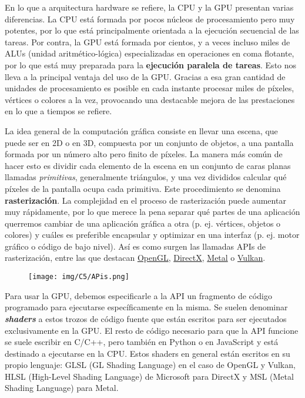 En lo que a arquitectura hardware se refiere, la CPU y la GPU presentan varias diferencias. La CPU está formada por pocos núcleos de procesamiento pero muy potentes, por lo que está principalmente orientada a la ejecución secuencial de las tareas. Por contra, la GPU está formada por cientos, y a veces incluso miles de ALUs (unidad aritmético-lógica) especializadas en operaciones en coma flotante, por lo que está muy preparada para la \textbf{ejecución paralela de tareas}. Esto nos lleva a la principal ventaja del uso de la GPU. Gracias a esa gran cantidad de unidades de procesamiento es posible en cada instante procesar miles de píxeles, vértices o colores a la vez, provocando una destacable mejora de las prestaciones en lo que a tiempos se refiere.

La idea general de la computación gráfica consiste en llevar una escena, que puede ser en 2D o en 3D, compuesta por un conjunto de objetos, a una pantalla formada por un número alto pero finito de píxeles. La manera más común de hacer esto es dividir cada elemento de la escena en un conjunto de caras planas llamadas \textit{primitivas}, generalmente triángulos, y una vez divididos calcular qué píxeles de la pantalla ocupa cada primitiva. Este procedimiento se denomina \textbf{rasterización}. La complejidad en el proceso de rasterización puede aumentar muy rápidamente, por lo que merece la pena separar qué partes de una aplicación querremos cambiar de una aplicación gráfica a otra (p. ej. vértices, objetos o colores) y cuáles es preferible encapsular y optimizar en una interfaz (p. ej. motor gráfico o código de bajo nivel). Así es como surgen las llamadas APIs de rasterización, entre las que destacan \textcolor{blue}{\href{https://www.opengl.org/}{OpenGL}}, \textcolor{blue}{\href{https://www.microsoft.com/es-es/download/details.aspx?id=35}{DirectX}}, \textcolor{blue}{\href{https://developer.apple.com/metal/}{Metal}} o \textcolor{blue}{\href{https://www.vulkan.org/}{Vulkan}}.

\begin{figure} [ht]
    \centering
    \texttt{[image: img/C5/APis.png]}
\end{figure}

Para usar la GPU, debemos especificarle a la API un fragmento de código programado para ejecutarse específicamente en la misma. Se suelen denominar \textbf{\textit{shaders}} a estos trozos de código fuente que están escritos para ser ejecutados exclusivamente en la GPU. El resto de código necesario para que la API funcione se suele escribir en C/C++, pero también en Python o en JavaScript y está destinado a ejecutarse en la CPU. Estos shaders en general están escritos en su propio lenguaje: GLSL (GL Shading Language) en el caso de OpenGL y Vulkan, HLSL (High-Level Shading Language) de Microsoft para DirectX y MSL (Metal Shading Language) para Metal. 


